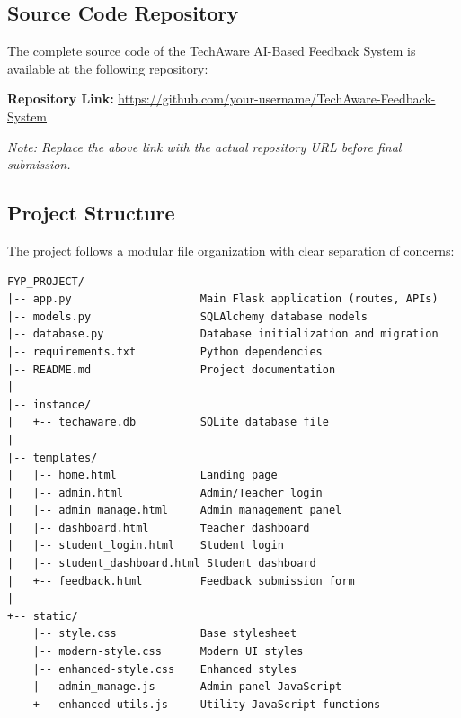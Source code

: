 \subsection*{Source Code Repository}

The complete source code of the TechAware AI-Based Feedback System is available at the following repository:

\vspace{0.5cm}

\noindent
\textbf{Repository Link:} \url{https://github.com/your-username/TechAware-Feedback-System}

\vspace{0.5cm}

\noindent
\textit{Note: Replace the above link with the actual repository URL before final submission.}

\subsection*{Project Structure}

The project follows a modular file organization with clear separation of concerns:

\begin{verbatim}
FYP_PROJECT/
|-- app.py                    Main Flask application (routes, APIs)
|-- models.py                 SQLAlchemy database models
|-- database.py               Database initialization and migration
|-- requirements.txt          Python dependencies
|-- README.md                 Project documentation
|
|-- instance/
|   +-- techaware.db          SQLite database file
|
|-- templates/
|   |-- home.html             Landing page
|   |-- admin.html            Admin/Teacher login
|   |-- admin_manage.html     Admin management panel
|   |-- dashboard.html        Teacher dashboard
|   |-- student_login.html    Student login
|   |-- student_dashboard.html Student dashboard
|   +-- feedback.html         Feedback submission form
|
+-- static/
    |-- style.css             Base stylesheet
    |-- modern-style.css      Modern UI styles
    |-- enhanced-style.css    Enhanced styles
    |-- admin_manage.js       Admin panel JavaScript
    +-- enhanced-utils.js     Utility JavaScript functions
\end{verbatim}

